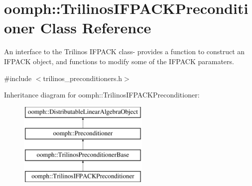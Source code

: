 \hypertarget{classoomph_1_1TrilinosIFPACKPreconditioner}{}\section{oomph\+:\+:Trilinos\+I\+F\+P\+A\+C\+K\+Preconditioner Class Reference}
\label{classoomph_1_1TrilinosIFPACKPreconditioner}


An interface to the Trilinos I\+F\+P\+A\+CK class-\/ provides a function to construct an I\+F\+P\+A\+CK object, and functions to modify some of the I\+F\+P\+A\+CK paramaters.  




{\ttfamily \#include $<$trilinos\+\_\+preconditioners.\+h$>$}

Inheritance diagram for oomph\+:\+:Trilinos\+I\+F\+P\+A\+C\+K\+Preconditioner\+:\begin{figure}[H]
\begin{center}
\leavevmode
\includegraphics[height=4.000000cm]{classoomph_1_1TrilinosIFPACKPreconditioner}
\end{center}
\end{figure}
